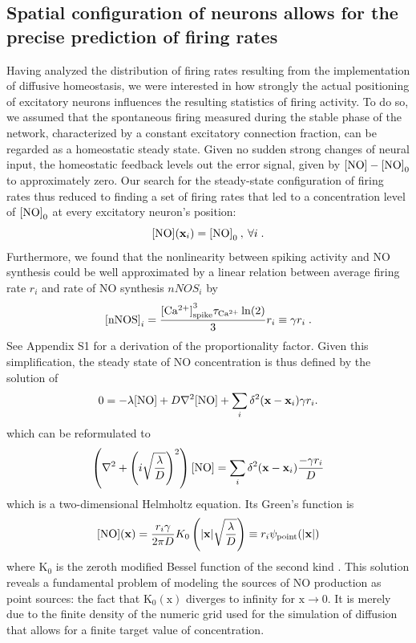 \documentclass[10pt,letterpaper]{article}
\begin{document}
\subsection*{Spatial configuration of neurons allows for the precise prediction of firing rates}\label{Section_Rand_Mat_vs_Sim}
Having analyzed the distribution of firing rates resulting from the implementation of diffusive homeostasis, we were interested in how strongly the actual positioning of excitatory neurons influences the resulting statistics of firing activity. To do so, we assumed that the spontaneous firing measured during the stable phase of the network, characterized by a constant excitatory connection fraction, can be regarded as a homeostatic steady state. Given no sudden strong changes of neural input, the homeostatic feedback levels out the error signal, given by ${\rm [NO]} - {\rm [NO]}_0$ to approximately zero. Our search for the steady-state configuration of firing rates thus reduced to finding a set of firing rates that led to a concentration level of ${\rm [NO]}_0$ at every excitatory neuron's position:
\begin{equation}
{\rm [NO]}(\mathbf{x}_{i}) = {\rm [NO]}_0 \:, \: \forall i \; .
\label{NO_equil_cond}
\end{equation}
Furthermore, we found that the nonlinearity between spiking activity and NO synthesis could be well approximated by a linear relation between average firing rate $r_i$ and rate of NO synthesis $nNOS_i$ by
\begin{equation}
{\rm [nNOS]}_i = \frac{{\rm [Ca^{2+}]}^3_{\rm spike} \tau_{\rm Ca^{2+}}\ln(2)}{3} r_i \equiv \gamma r_i \; .
\label{simpl_nNOS}
\end{equation}
See Appendix S1 for a derivation of the proportionality factor. Given this simplification, the steady state of NO concentration is thus defined by the solution of
\begin{equation}
0 =-\lambda {\rm [NO]} + D \nabla^2 {\rm [NO]} + \sum_{i} \delta^2(\mathbf{x}-\mathbf{x}_{i}) \gamma r_i .\label{simple_NO_dyn_with_diff}
\end{equation}
which can be reformulated to
\begin{equation}
\left(\nabla^2 + \left( i\sqrt{\frac{\lambda}{D}}\right)^2\right) {\rm [NO]} = \sum_{i} \delta^2(\mathbf{x}-\mathbf{x}_{i}) \frac{- \gamma r_i}{D}
\label{simple_NO_dyn_with_diff_equil_helmholtz}
\end{equation}
which is a two-dimensional Helmholtz equation. Its Green's function is
\begin{equation}
{\rm [NO]}(\mathbf{x}) = \frac{r_i \gamma}{2 \pi D} K_0 \left(|\mathbf{x}|\sqrt{\frac{\lambda}{D}} \right) \equiv r_i  \psi_{\rm point}(|\mathbf{x}|)
\label{solution_diff_equil_bessel}
\end{equation}
where $\mathrm{K_0}$ is the zeroth modified Bessel function of the second kind \cite{Helmholtz_Solution_2d}.  This solution reveals a fundamental problem of modeling the sources of NO production as point sources: the fact that $\mathrm{K_0(x)}$ diverges to infinity for $\mathrm{x\rightarrow 0}$. It is merely due to the finite density of the numeric grid used for the simulation of diffusion that allows for a finite target value of concentration.
\end{document}
